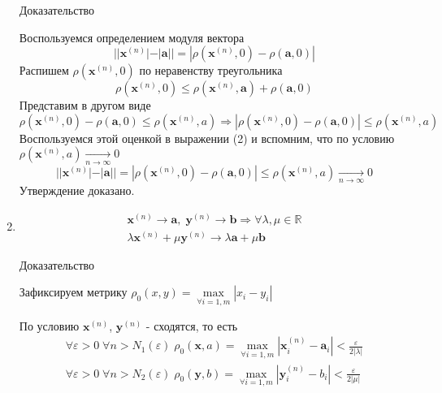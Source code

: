 \begin{enumerate}
  Доказательство
  
  Воспользуемся определением модуля вектора
  \begin{equation}
  ||\textbf {x}^{(n)}| - |\textbf {a}|| = |\rho(\textbf {x}^{(n)}, 0) - \rho(\textbf {a}, 0)|
  \end{equation}
  Распишем $\rho(\textbf {x}^{(n)}, 0)$ по неравенству треугольника
  $$
  \rho(\textbf {x}^{(n)}, 0) \leq \rho(\textbf {x}^{(n)}, \textbf {a}) + \rho(\textbf {a}, 0) 
  $$
  Представим в другом виде
  $$
  \rho(\textbf {x}^{(n)}, 0) - \rho(\textbf {a}, 0) \leq \rho(\textbf {x}^{(n)}, a) \Rightarrow |\rho(\textbf {x}^{(n)}, 0) - \rho(\textbf {a}, 0)| \leq \rho(\textbf {x}^{(n)}, a) 
  $$
  Воспользуемся этой оценкой в выражении (2) и вспомним, что по условию ${\rho(\textbf {x}^{(n)}, a) \underset{n \to \infty}{\longrightarrow} 0}$
  $$
  ||\textbf {x}^{(n)}| - |\textbf {a}|| = |\rho(\textbf {x}^{(n)}, 0) - \rho(\textbf {a}, 0)| \leq \rho(\textbf {x}^{(n)}, a) \underset{n \to \infty}{\longrightarrow} 0
  $$
  Утверждение доказано.
  \item
  \begin{equation*}
  \begin{gathered}
  \textbf {x}^{(n)} \longrightarrow \textbf {a}, \; \textbf {y}^{(n)} \longrightarrow \textbf {b} \Rightarrow \forall \lambda, \mu \in \mathbb {R}\\
  \lambda \textbf {x}^{(n)} + \mu \textbf {y}^{(n)} \longrightarrow \lambda \textbf {a} + \mu \textbf {b}
  \end{gathered}
  \end{equation*}
  
  Доказательство
  
  Зафиксируем метрику $\rho_0(x, y) = \underset{\forall i=1, m}{\max}{|x_i - y_i|}$
  
  По условию $\textbf {x}^{(n)}$, $\textbf {y}^{(n)}$ - сходятся, то есть
  \begin{equation*}
  \begin{gathered}
  \forall \varepsilon > 0 \; \forall n > N_1(\varepsilon) \;\rho_0(\textbf {x}, a) = \underset{\forall i=1, m}{\max}{|\textbf{x}^{(n)}_i - \textbf{a}_i|} < \frac{\varepsilon}{2|\lambda|}\\
    \forall \varepsilon > 0 \; \forall n > N_2(\varepsilon) \;\rho_0(\textbf {y}, b) = \underset{\forall i=1, m}{\max}{|\textbf{y}^{(n)}_i - b_i|} < \frac{\varepsilon}{2|\mu|}
  \end{gathered}
  \end{equation*}
  

\end{enumerate}
